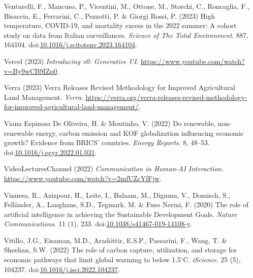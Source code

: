 \documentclass[
  letterpaper,
  DIV=11,
  numbers=noendperiod]{scrartcl}
\newlength{\cslhangindent}
\newenvironment{CSLReferences}[2] %
 {\begin{list}{}{%
  \setlength{\itemindent}{0pt}
  \setlength{\leftmargin}{0pt}
  \setlength{\parsep}{0pt}
  \ifodd #1
   \setlength{\leftmargin}{\cslhangindent}
   \setlength{\itemindent}{-1\cslhangindent}
  \fi
  \setlength{\itemsep}{#2\baselineskip}}}
 {\end{list}}
\begin{document}
\begin{CSLReferences}{0}{1}
Venturelli, F., Mancuso, P., Vicentini, M., Ottone, M., Storchi, C.,
Roncaglia, F., Bisaccia, E., Ferrarini, C., Pezzotti, P. \& Giorgi
Rossi, P. (2023) High temperature, {COVID-19}, and mortality excess in
the 2022 summer: A cohort study on data from {Italian} surveillances.
\emph{Science of The Total Environment}. 887, 164104.
doi:\href{https://doi.org/10.1016/j.scitotenv.2023.164104}{10.1016/j.scitotenv.2023.164104}.

Vercel (2023) \emph{Introducing v0: {Generative UI}}.
\url{https://www.youtube.com/watch?v=By9wCB9IZp0}.

Verra (2023) Verra {Releases Revised Methodology} for {Improved
Agricultural Land Management}. \emph{Verra}.
\url{https://verra.org/verra-releases-revised-methodology-for-improved-agricultural-land-management/}.

Viana Espinosa De Oliveira, H. \& Moutinho, V. (2022) Do renewable,
non-renewable energy, carbon emission and {KOF} globalization
influencing economic growth? {Evidence} from {BRICS}' countries.
\emph{Energy Reports}. 8, 48--53.
doi:\href{https://doi.org/10.1016/j.egyr.2022.01.031}{10.1016/j.egyr.2022.01.031}.

VideoLecturesChannel (2022) \emph{Communication in {Human-AI
Interaction}}. \url{https://www.youtube.com/watch?v=2mfUZcYfFjw}.

Vinuesa, R., Azizpour, H., Leite, I., Balaam, M., Dignum, V., Domisch,
S., Felländer, A., Langhans, S.D., Tegmark, M. \& Fuso Nerini, F. (2020)
The role of artificial intelligence in achieving the {Sustainable
Development Goals}. \emph{Nature Communications}. 11 (1), 233.
doi:\href{https://doi.org/10.1038/s41467-019-14108-y}{10.1038/s41467-019-14108-y}.

Vitillo, J.G., Eisaman, M.D., Aradóttir, E.S.P., Passarini, F., Wang, T.
\& Sheehan, S.W. (2022) The role of carbon capture, utilization, and
storage for economic pathways that limit global warming to below
1.5{\(^\circ\)}{C}. \emph{iScience}. 25 (5), 104237.
doi:\href{https://doi.org/10.1016/j.isci.2022.104237}{10.1016/j.isci.2022.104237}.


\end{CSLReferences}
\end{document}
